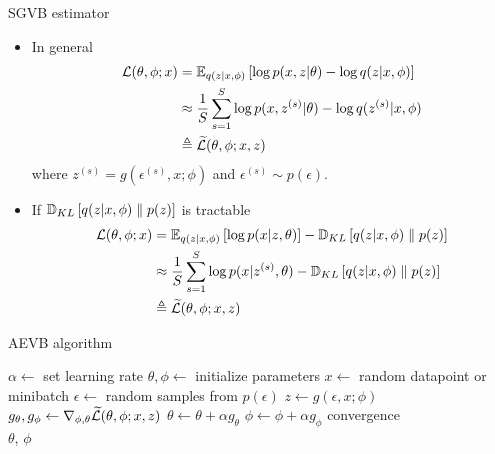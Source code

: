 \documentclass[unicode,11pt]{beamer}
\begin{document}
\begin{frame}{SGVB estimator}
  \begin{itemize}
  \item In general
    \begin{align*}
      \mathcal{L}(\theta, \phi; x)
      &= \E{q(z|x, \phi)}{\log p(x, z|\theta) - \log q(z|x, \phi)} \\
      &\approx \frac{1}{S} \sum\limits_{s = 1}^S
            \log p(x, z^{(s)}|\theta) - \log q(z^{(s)}|x, \phi) \\
      &\triangleq \widetilde{\mathcal{L}}(\theta, \phi; x, z)
    \end{align*}
    where $z^{(s)} = g(\epsilon^{(s)}, x; \phi)$ and $\epsilon^{(s)} \sim p(\epsilon)$.
  \item If $\mathbb{D}_{KL}\left[ q(z|x, \phi) \parallel p(z) \right]$ is tractable
    \begin{align*}
      \mathcal{L}(\theta, \phi; x)
      &= \E{q(z|x, \phi)}{\log p(x|z, \theta)} - \KL{q(z|x, \phi)}{p(z)} \\
      &\approx \frac{1}{S} \sum\limits_{s = 1}^S \log p(x|z^{(s)}, \theta)
       - \KL{q(z|x, \phi)}{p(z)} \\
      &\triangleq \widetilde{\mathcal{L}}(\theta, \phi; x, z)
    \end{align*}
  \end{itemize}
\end{frame}


\begin{frame}{AEVB algorithm \cite{kingma2013auto}}
  \centering
  \begin{algorithmic}
    \State $\alpha \gets$ set learning rate
    \State $\theta, \phi \gets$ initialize parameters
    \Repeat
       \State $x \gets$ random datapoint or minibatch
       \State $\epsilon \gets$ random samples from $p(\epsilon)$
       \State $z \gets g(\epsilon, x; \phi)$
       \State $g_\theta, g_\phi \gets \grad_{\phi, \theta} %
           \mathcal{\widetilde{L}}(\theta, \phi; x, z)$
       \State $\theta \gets \theta + \alpha g_\theta$
       \State $\phi \gets \phi + \alpha g_\phi$
    \Until convergence \\
    \Return $\theta$, $\phi$
  \end{algorithmic}
\end{frame}
\end{document}
